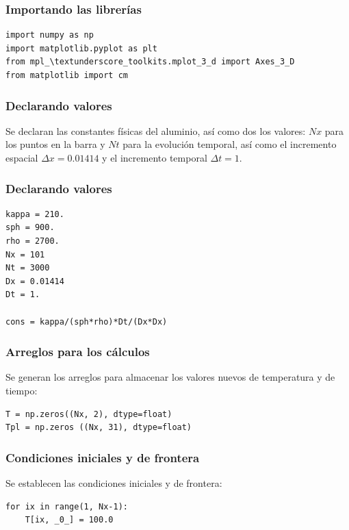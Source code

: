 \documentclass[12pt]{beamer}
\begin{document}
{
\begin{frame}
\frametitle{Importando las librerías}
\begin{lstlisting}[caption=Llamada a las librerías, style=FormattedNumber, basicstyle=\linespread{1.1}\ttfamily=\small, columns=fullflexible]
import numpy as np
import matplotlib.pyplot as plt
from mpl_\textunderscore_toolkits.mplot_3_d import Axes_3_D
from matplotlib import cm
\end{lstlisting}
\end{frame}
\begin{frame}
\frametitle{Declarando valores}
Se declaran las constantes físicas del aluminio, así como dos los valores: $Nx$ para los puntos en la barra y $Nt$ para la evolución temporal, así como el incremento espacial $\Delta x = 0.01414$ y el incremento temporal $\Delta t= 1$.
\end{frame}
\begin{frame}
\frametitle{Declarando valores}
\begin{lstlisting}[caption=Declarando valores para el algoritmo, style=FormattedNumber, basicstyle=\linespread{1.1}\ttfamily=\small, columns=fullflexible]
kappa = 210.
sph = 900.
rho = 2700.
Nx = 101
Nt = 3000
Dx = 0.01414
Dt = 1.

cons = kappa/(sph*rho)*Dt/(Dx*Dx)
\end{lstlisting}
\end{frame}
\begin{frame}
\frametitle{Arreglos para los cálculos}
Se generan los arreglos para almacenar los valores nuevos de temperatura y de tiempo:
\begin{lstlisting}[caption=Arreglos para los cálculos de temperatura, style=FormattedNumber, basicstyle=\linespread{1.1}\ttfamily=\small, columns=fullflexible]
T = np.zeros((Nx, 2), dtype=float)
Tpl = np.zeros ((Nx, 31), dtype=float)
\end{lstlisting}
\end{frame}
\begin{frame}
\frametitle{Condiciones iniciales y de frontera}
Se establecen las condiciones iniciales y de frontera:
\begin{lstlisting}[caption=Se definen las condiciones iniciales y de frontera, style=FormattedNumber, basicstyle=\linespread{1.1}\ttfamily=\small, columns=fullflexible]
for ix in range(1, Nx-1):
    T[ix, _0_] = 100.0


\end{lstlisting}
\end{frame}}
\end{document}
